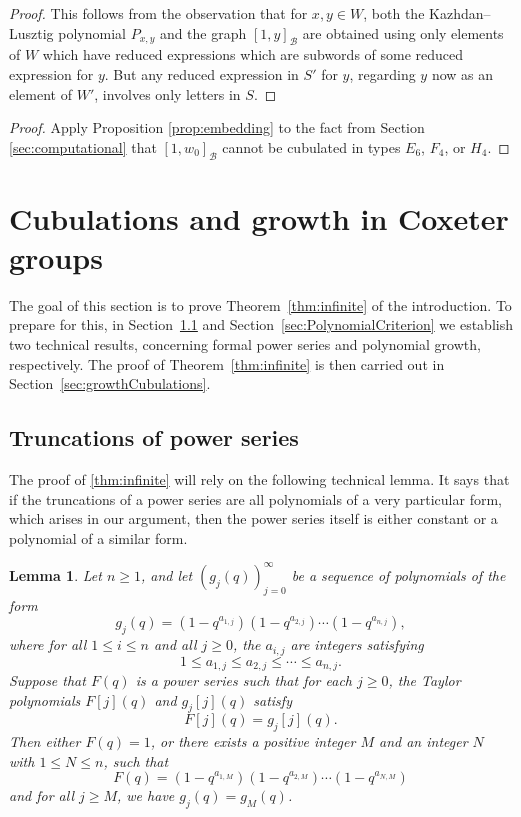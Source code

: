\documentclass[11pt]{amsart}
\theoremstyle{plain}
\newtheorem{lemma}[thm]{Lemma}
\theoremstyle{definition}
\newcommand{\cB}{\mathcal B}
\newcommand{\Pxy}{P_{x,y}} %
\numberwithin{equation}{subsection}
\begin{document}
\begin{proof} This follows from the observation that for $x, y \in W$, both the Kazhdan--Lusztig polynomial $\Pxy$ and the graph $[1,y]_\cB$ are obtained using only elements of $W$ which have reduced expressions which are subwords of some reduced expression for $y$. But any reduced expression in $S'$ for $y$, regarding $y$ now as an element of $W'$, involves only letters in $S$.
\end{proof}


\MainTheoremB

\begin{proof}%
Apply Proposition \ref{prop:embedding} to the fact from Section \ref{sec:computational} that $[1,w_0]_{\cB}$ cannot be cubulated in types $E_6$, $F_4$, or $H_4$.
\end{proof}



\section{Cubulations and growth in Coxeter groups}\label{sec:CubulationGrowth}

The goal of this section is to prove Theorem~\ref{thm:infinite} of the introduction. To prepare for this, in Section~\ref{sec:series} and Section~\ref{sec:PolynomialCriterion} we establish two technical results, concerning formal power series and polynomial growth, respectively.  The proof of Theorem~\ref{thm:infinite} is then carried out in Section~\ref{sec:growthCubulations}.

\subsection{Truncations of power series}\label{sec:series}

The proof of \cref{thm:infinite} will rely on the following technical lemma. It says that if the truncations of a power series are all polynomials of a very particular form, which arises in our argument, then the power series itself is either constant or a polynomial of a similar form.  

\begin{lemma}\label{lem:limit-of-quantum}
  Let $n \geq 1$, and let $(g_j(q))_{j=0}^\infty$ be a sequence of polynomials of the form
	\[
	g_j(q)
	=
	(1 - q^{a_{1,j}})
	(1 - q^{a_{2,j}})
	\cdots
	(1 - q^{a_{n,j}}),
	\]
	where for all $1 \leq i \leq n$ and all $j \geq 0$, the $a_{i,j}$ are integers satisfying \[ 1 \leq a_{1,j} \leq a_{2,j} \leq \cdots \leq a_{n,j}.\]
	Suppose that $F(q)$ is a power series such that for each $j \geq 0$, the Taylor polynomials $F[j](q)$ and $g_j[j](q)$ satisfy \[ F[j](q) = g_j[j](q).\] 
	Then either $F(q) = 1$, or there exists a positive integer $M$ and an integer $N$ with $1 \leq N \leq n$, such that 
	\[
	F(q) =
	(1 - q^{a_{1,M}})
	(1 - q^{a_{2,M}})
	\cdots
	(1 - q^{a_{N,M}})
	\]
	and for all $j \geq M$, we have $g_j(q) = g_M(q)$.
\end{lemma}
\end{document}
